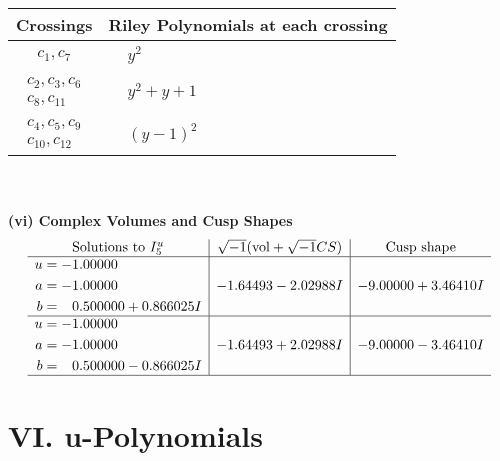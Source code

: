 \documentclass[1p]{elsarticle_modified}
\theoremstyle{definition}
\newcommand{\I}{\sqrt{-1}}
\begin{document}
\begin{tabular}{m{50pt}|m{274pt}}
Crossings & \hspace{64pt}Riley Polynomials at each crossing \\
\hline $$\begin{aligned}c_{1},c_{7}\end{aligned}$$&$\begin{aligned}
&y^2
\end{aligned}$\\
\hline $$\begin{aligned}c_{2},c_{3},c_{6}\\c_{8},c_{11}\end{aligned}$$&$\begin{aligned}
&y^2+y+1
\end{aligned}$\\
\hline $$\begin{aligned}c_{4},c_{5},c_{9}\\c_{10},c_{12}\end{aligned}$$&$\begin{aligned}
&(y-1)^2
\end{aligned}$\\
\hline
\end{tabular}\\~\\
\newpage\flushleft \textbf{(vi) Complex Volumes and Cusp Shapes}
$$\begin{array}{c|c|c}  
\text{Solutions to }I^u_{5}& \I (\text{vol} + \sqrt{-1}CS) & \text{Cusp shape}\\
 \hline 
\begin{aligned}
u &= -1.00000\phantom{ +0.000000I} \\
a &= -1.00000\phantom{ +0.000000I} \\
b &= \phantom{-}0.500000 + 0.866025 I\end{aligned}
 & -1.64493 - 2.02988 I & -9.00000 + 3.46410 I \\ \hline\begin{aligned}
u &= -1.00000\phantom{ +0.000000I} \\
a &= -1.00000\phantom{ +0.000000I} \\
b &= \phantom{-}0.500000 - 0.866025 I\end{aligned}
 & -1.64493 + 2.02988 I & -9.00000 - 3.46410 I\\
 \hline 
 \end{array}$$\newpage
\newpage\renewcommand{\arraystretch}{1}
\centering \section*{ VI. u-Polynomials}
\end{document}
